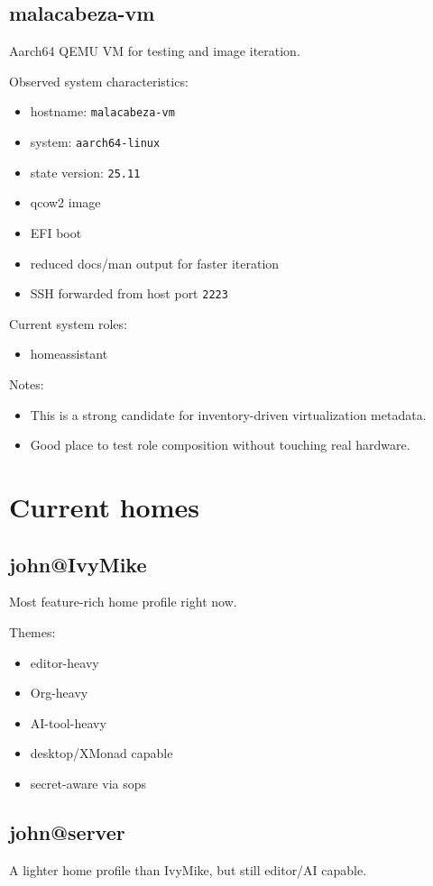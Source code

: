 \documentclass[11pt]{article}
\begin{document}
\subsection{malacabeza-vm}
\label{sec:org38c969b}
Aarch64 QEMU VM for testing and image iteration.

Observed system characteristics:
\begin{itemize}
\item hostname: \texttt{malacabeza-vm}
\item system: \texttt{aarch64-linux}
\item state version: \texttt{25.11}
\item qcow2 image
\item EFI boot
\item reduced docs/man output for faster iteration
\item SSH forwarded from host port \texttt{2223}
\end{itemize}

Current system roles:
\begin{itemize}
\item homeassistant
\end{itemize}

Notes:
\begin{itemize}
\item This is a strong candidate for inventory-driven virtualization metadata.
\item Good place to test role composition without touching real hardware.
\end{itemize}
\section{Current homes}
\label{sec:orged87b2d}

\subsection{john@IvyMike}
\label{sec:orga7a0a55}
Most feature-rich home profile right now.

Themes:
\begin{itemize}
\item editor-heavy
\item Org-heavy
\item AI-tool-heavy
\item desktop/XMonad capable
\item secret-aware via sops
\end{itemize}
\subsection{john@server}
\label{sec:orgd3d2e7d}
A lighter home profile than IvyMike, but still editor/AI capable.
\end{document}
